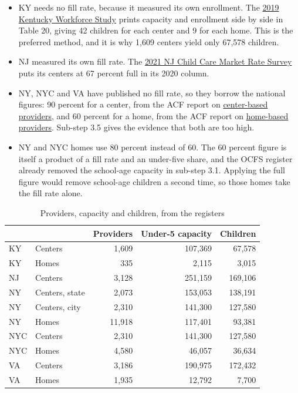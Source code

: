 \documentclass[11pt]{article}
\begin{document}
\begin{itemize}
\setlength{\itemsep}{0.45em}
\item KY needs no fill rate, because it measured its own enrollment. The
      \href{https://www.childcareawareky.org/research/}{2019 Kentucky Workforce
      Study} prints capacity and enrollment side by side in Table 20, giving 42
      children for each center and 9 for each home. This is the preferred
      method, and it is why 1,609 centers yield only 67,578 children.
\item NJ measured its own fill rate. The
      \href{https://www.childcarenj.gov/Resources/Reports}{2021 NJ Child Care
      Market Rate Survey} puts its centers at 67 percent full in its 2020
      column.
\item NY, NYC and VA have published no fill rate, so they borrow the national
      figures: 90 percent for a center, from the ACF report on
      \href{https://acf.gov/opre/report/center-based-early-care-and-education-providers-2012-and-2019-counts-and}{center-based
      providers}, and 60 percent for a home, from the ACF report on
      \href{https://acf.gov/opre/report/home-based-early-care-and-education-providers-2012-and-2019-counts-and-characteristics}{home-based
      providers}. Sub-step 3.5 gives the evidence that both are too high.
\item NY and NYC homes use 80 percent instead of 60. The 60 percent figure is
      itself a product of a fill rate and an under-five share, and the OCFS
      register already removed the school-age capacity in sub-step 3.1. Applying
      the full figure would remove school-age children a second time, so those
      homes take the fill rate alone.
\end{itemize}

\begin{table}[H]
\centering
\caption{Providers, capacity and children, from the registers}
\begin{tabular}{L{1.6cm}L{3.2cm}rrr}
\toprule
& & \textbf{Providers} & \textbf{Under-5 capacity} & \textbf{Children} \\
\midrule
KY  & Centers        &  1,609 & 107,369 &  67,578 \\
KY  & Homes          &    335 &   2,115 &   3,015 \\
NJ  & Centers        &  3,128 & 251,159 & 169,106 \\
NY  & Centers, state &  2,073 & 153,053 & 138,191 \\
NY  & Centers, city  &  2,310 & 141,300 & 127,580 \\
NY  & Homes          & 11,918 & 117,401 &  93,381 \\
NYC & Centers        &  2,310 & 141,300 & 127,580 \\
NYC & Homes          &  4,580 &  46,057 &  36,634 \\
VA  & Centers        &  3,186 & 190,975 & 172,432 \\
VA  & Homes          &  1,935 &  12,792 &   7,700 \\
\bottomrule
\end{tabular}
\end{table}
\end{document}
